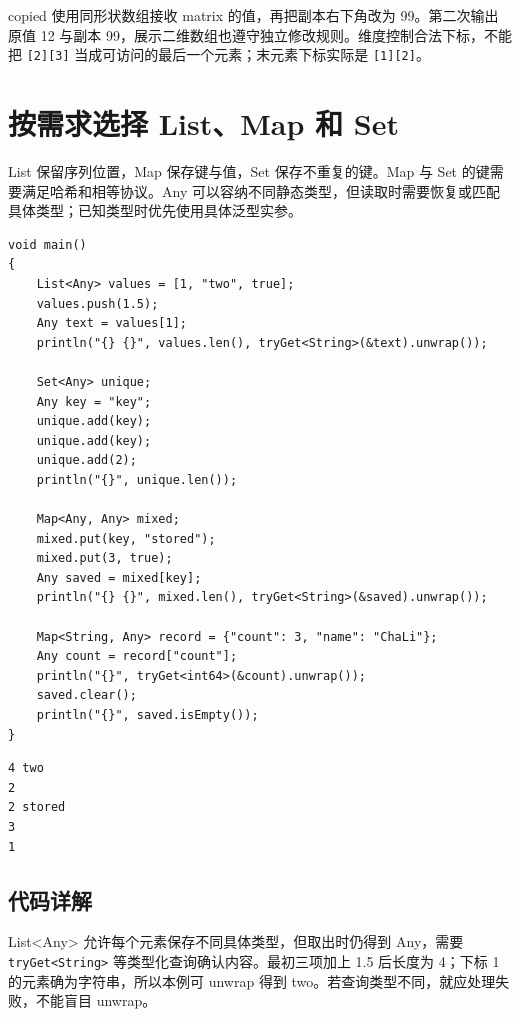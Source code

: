 copied 使用同形状数组接收 matrix 的值，再把副本右下角改为 99。第二次输出原值 12 与副本 99，展示二维数组也遵守独立修改规则。维度控制合法下标，不能把 \texttt{[\allowbreak{}2]\allowbreak{}[\allowbreak{}3]\allowbreak{}} 当成可访问的最后一个元素；末元素下标实际是 \texttt{[\allowbreak{}1]\allowbreak{}[\allowbreak{}2]\allowbreak{}}。

\section{按需求选择 List、Map 和 Set}

List 保留序列位置，Map 保存键与值，Set 保存不重复的键。Map 与 Set 的键需要满足哈希和相等协议。Any 可以容纳不同静态类型，但读取时需要恢复或匹配具体类型；已知类型时优先使用具体泛型实参。

\par
\medskip
\begin{lstlisting}[style=chali]
void main()
{
    List<Any> values = [1, "two", true];
    values.push(1.5);
    Any text = values[1];
    println("{} {}", values.len(), tryGet<String>(&text).unwrap());

    Set<Any> unique;
    Any key = "key";
    unique.add(key);
    unique.add(key);
    unique.add(2);
    println("{}", unique.len());

    Map<Any, Any> mixed;
    mixed.put(key, "stored");
    mixed.put(3, true);
    Any saved = mixed[key];
    println("{} {}", mixed.len(), tryGet<String>(&saved).unwrap());

    Map<String, Any> record = {"count": 3, "name": "ChaLi"};
    Any count = record["count"];
    println("{}", tryGet<int64>(&count).unwrap());
    saved.clear();
    println("{}", saved.isEmpty());
}
\end{lstlisting}
\par
\medskip

\par
\medskip
\begin{lstlisting}[style=out]
4 two
2
2 stored
3
1
\end{lstlisting}
\par
\medskip

\subsection*{代码详解}

List<Any> 允许每个元素保存不同具体类型，但取出时仍得到 Any，需要 \texttt{try\allowbreak{}Get<\allowbreak{}String>\allowbreak{}} 等类型化查询确认内容。最初三项加上 1.5 后长度为 4；下标 1 的元素确为字符串，所以本例可 unwrap 得到 two。若查询类型不同，就应处理失败，不能盲目 unwrap。

